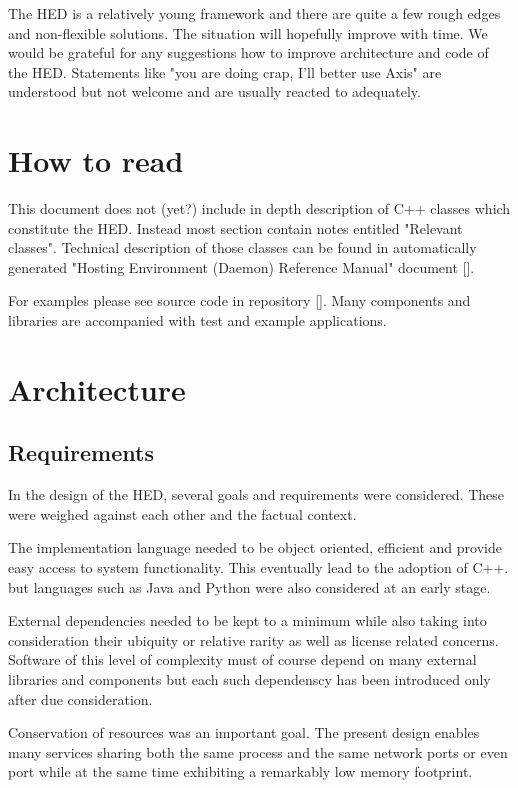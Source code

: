 \documentclass{book}
\begin{document}
The HED is a relatively young framework and there are quite a few rough edges and non-flexible solutions. The situation will hopefully improve with time. We would be grateful for any suggestions how to improve architecture and code of the HED. Statements like "you are doing crap, I'll better use Axis" are understood but not welcome and are usually reacted to adequately.

\chapter{How to read}

This document does not (yet?) include in depth description of C++ classes which constitute the HED. Instead most section contain notes entitled "Relevant classes". Technical description of those classes can be found in automatically generated "Hosting Environment (Daemon) Reference Manual" document [].

For examples please see source code in repository []. Many components and libraries are accompanied with test and example applications.


\chapter{Architecture}

\section{Requirements}
In the design of the HED, several goals and requirements were considered. These were weighed against each other and the factual context.

The implementation language needed to be object oriented, efficient and provide easy access to system functionality. This eventually lead to the adoption of C++. but languages such as Java and Python were also considered at an early stage.

External dependencies needed to be kept to a minimum while also taking into consideration their ubiquity or relative rarity as well as license related concerns. Software of this level of complexity must of course depend on many external libraries and components but each such dependenscy has been introduced only after due consideration.

Conservation of resources was an important goal. The present design enables many services sharing both the same process and the same network ports or even port while at the same time exhibiting a remarkably low memory footprint.
\end{document}
